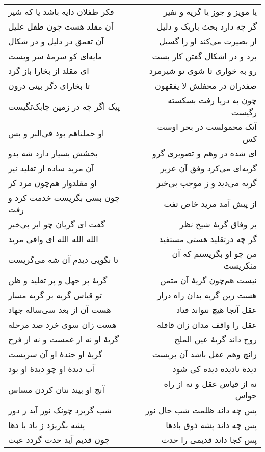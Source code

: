 \begin{center}
\begin{longtable}{l p{0.5cm} r}
\\
فکر طفلان دایه باشد یا که شیر
&&
یا مویز و جوز یا گریه و نفیر
\\
آن مقلد هست چون طفل علیل
&&
گر چه دارد بحث باریک و دلیل
\\
آن تعمق در دلیل و در شکال
&&
از بصیرت می‌کند او را گسیل
\\
مایه‌ای کو سرمهٔ سر ویست
&&
برد و در اشکال گفتن کار بست
\\
ای مقلد از بخارا باز گرد
&&
رو به خواری تا شوی تو شیرمرد
\\
تا بخارای دگر بینی درون
&&
صفدران در محفلش لا یفقهون
\\
پیک اگر چه در زمین چابک‌تگیست
&&
چون به دریا رفت بسکسته رگیست
\\
او حملناهم بود فی‌البر و بس
&&
آنک محمولست در بحر اوست کس
\\
بخشش بسیار دارد شه بدو
&&
ای شده در وهم و تصویری گرو
\\
آن مرید ساده از تقلید نیز
&&
گریه‌ای می‌کرد وفق آن عزیز
\\
او مقلدوار هم‌چون مرد کر
&&
گریه می‌دید و ز موجب بی‌خبر
\\
چون بسی بگریست خدمت کرد و رفت
&&
از پیش آمد مرید خاص تفت
\\
گفت ای گریان چو ابر بی‌خبر
&&
بر وفاق گریهٔ شیخ نظر
\\
الله الله الله ای وافی مرید
&&
گر چه درتقلید هستی مستفید
\\
تا نگویی دیدم آن شه می‌گریست
&&
من چو او بگریستم که آن منکریست
\\
گریهٔ پر جهل و پر تقلید و ظن
&&
نیست هم‌چون گریهٔ آن متمن
\\
تو قیاس گریه بر گریه مساز
&&
هست زین گریه بدان راه دراز
\\
هست آن از بعد سی‌ساله جهاد
&&
عقل آنجا هیچ نتواند فتاد
\\
هست زان سوی خرد صد مرحله
&&
عقل را واقف مدان زان قافله
\\
گریهٔ او نه از غمست و نه از فرح
&&
روح داند گریهٔ عین الملح
\\
گریهٔ او خندهٔ او آن سریست
&&
زانچ وهم عقل باشد آن بریست
\\
آب دیدهٔ او چو دیدهٔ او بود
&&
دیدهٔ نادیده دیده کی شود
\\
آنچ او بیند نتان کردن مساس
&&
نه از قیاس عقل و نه از راه حواس
\\
شب گریزد چونک نور آید ز دور
&&
پس چه داند ظلمت شب حال نور
\\
پشه بگریزد ز باد با دها
&&
پس چه داند پشه ذوق بادها
\\
چون قدیم آید حدث گردد عبث
&&
پس کجا داند قدیمی را حدث
\\

\end{longtable}
\end{center}
